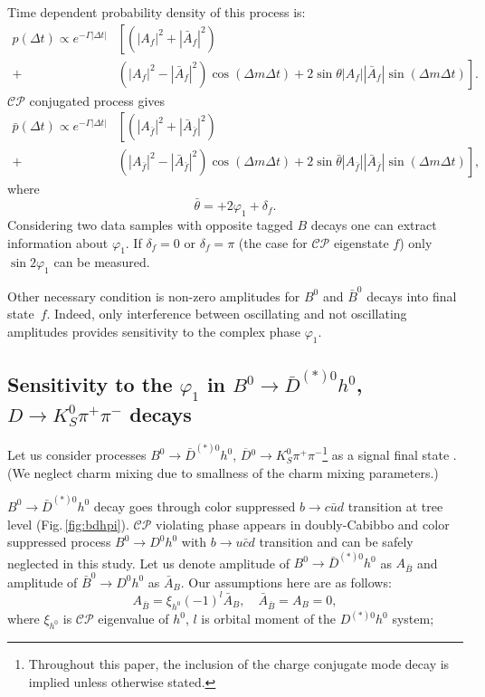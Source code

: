 \documentclass[preprint,aps,showpacs]{revtex4}
\newcommand{\dt}{\ensuremath{\Delta t}\xspace}
\newcommand{\cpconj}{\ensuremath{\mathcal{CP}}\xspace}
\newcommand{\dkpp}{\ensuremath{D\to K^0_S\pi^+\pi^-}\xspace}
\newcommand{\dbkpp}{\ensuremath{\overline{D}{}^0\to K^0_S\pi^+\pi^-}\xspace}
\newcommand{\sindbeta}{\ensuremath{\sin{2\varphi_1}}\xspace}
\newcommand{\bdsth}{\ensuremath{B^0\to \bar D^{(*)0}h^0}\xspace}
\begin{document}
Time dependent probability density of this process is:
\begin{equation}
\begin{split}
 p(\Delta t) \propto e^{-\Gamma|\dt|}&\left[\left(\left|A_f\right|^2+\left|\bar A_f\right|^2\right)\right.\\
 +&\left.\left(\left|A_f\right|^2-\left|\bar A_f\right|^2\right)\cos(\Delta m\Delta t)+2\sin{\theta}\left|A_{f}\right|\left|\bar A_{f}\right|\sin(\Delta m\Delta t)\right].
\end{split}
\end{equation}
\cpconj conjugated process gives
\begin{equation}
\begin{split}
 \bar p(\Delta t) \propto e^{-\Gamma|\dt|}&\left[\left(\left|A_{\bar f}\right|^2+\left|\bar A_{\bar f}\right|^2\right)\right.\\
 +&\left.\left(\left|A_{\bar f}\right|^2-\left|\bar A_{\bar f}\right|^2\right)\cos(\Delta m\Delta t)+2\sin{\bar\theta}\left|A_{\bar f}\right|\left|\bar A_{\bar f}\right|\sin(\Delta m\Delta t)\right],
\end{split}
\end{equation}
where
\begin{equation}
 \bar\theta = +2\varphi_1 + \delta_f.
\end{equation}
Considering two data samples with opposite tagged $B$ decays one can extract information about $\varphi_1$. If $\delta_f=0$ or $\delta_f=\pi$ (the case for \cpconj eigenstate $f$) only \sindbeta can be measured.

Other necessary condition is non-zero amplitudes for $B^0$ and $\bar B^0$ decays into final state~$f$. Indeed, only interference between oscillating and not oscillating amplitudes provides sensitivity to the complex phase $\varphi_1$.

\subsection{Sensitivity to the $\varphi_1$ in \bdsth, \dkpp decays}
Let us consider processes \bdsth, \dbkpp\footnote{Throughout this paper, the inclusion of the charge conjugate mode decay is implied unless otherwise stated.} as a signal final state \cite{BGK}. (We neglect charm mixing due to smallness of the charm mixing parameters.)

\bdsth decay goes through color suppressed $b\to c\bar u d$ transition at tree level (Fig.\,\ref{fig:bdhpi}). \cpconj violating phase appears in doubly-Cabibbo and color suppressed process $B^0\to D^0h^0$ with $b\to u\bar c d$ transition and can be safely neglected in this study. Let us denote amplitude of \bdsth as $A_{\bar B}$ and amplitude of $\bar B^0\to D^0h^0$ as $\bar A_{B}$. Our assumptions here are as follows:
\begin{equation}
 A_{\bar B} = \xi_{h^0}(-1)^l\bar A_{B},\quad \bar A_{\bar B} = A_{B} = 0,
\end{equation}
where $\xi_{h^0}$ is \cpconj eigenvalue of $h^0$, $l$ is orbital moment of the $D^{(*)0}h^0$ system;
\end{document}
